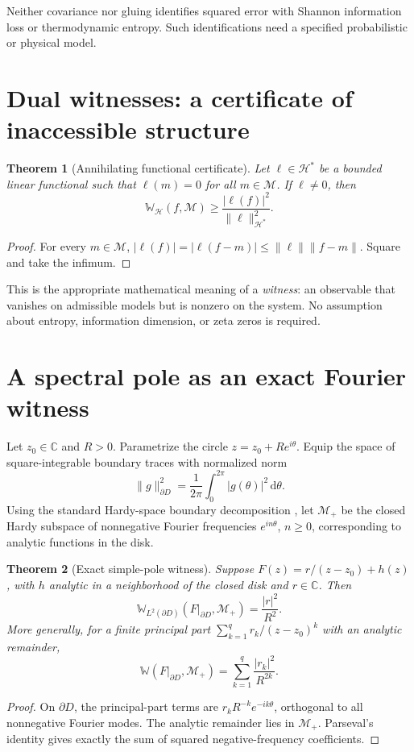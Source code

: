 \documentclass[11pt,letterpaper]{article}
\newtheorem{theorem}{Theorem}[section]
\newcommand{\HH}{\mathcal H}
\newcommand{\MM}{\mathcal M}
\newcommand{\WW}{\mathbb W}
\newcommand{\dd}{\,\mathrm d}
\newcommand{\C}{\mathbb C}
\begin{document}
Neither covariance nor gluing identifies squared error with Shannon
information loss or thermodynamic entropy. Such identifications need
a specified probabilistic or physical model.
\section{Dual witnesses: a certificate of inaccessible structure}
\begin{theorem}[Annihilating functional certificate]\label{thm:dual}
Let $\ell\in\HH^*$ be a bounded linear functional such that $\ell(m)=0$ for all $m\in\MM$. If $\ell\ne0$, then
\begin{equation}\label{eq:dual}
\WW_\HH(f,\MM)\ge\frac{|\ell(f)|^2}{\|\ell\|_{\HH^*}^2}.
\end{equation}
\end{theorem}
\begin{proof}
For every $m\in\MM$, $|\ell(f)|=|\ell(f-m)|\le\|\ell\|\|f-m\|$. Square and take the infimum.
\end{proof}

This is the appropriate mathematical meaning of a \emph{witness}: an observable that vanishes on admissible models but is nonzero on the system. No assumption about entropy, information dimension, or zeta zeros is required.

\section{A spectral pole as an exact Fourier witness}
Let $z_0\in\C$ and $R>0$. Parametrize the circle $z=z_0+Re^{i\theta}$. Equip the space of square-integrable boundary traces with normalized norm
\[
\|g\|_{\partial D}^2=\frac1{2\pi}\int_0^{2\pi}|g(\theta)|^2\dd\theta.
\]
Using the standard Hardy-space boundary decomposition \cite{duren}, let $\MM_+$ be the closed Hardy subspace of nonnegative Fourier frequencies $e^{in\theta}$, $n\ge0$, corresponding to analytic functions in the disk.

\begin{theorem}[Exact simple-pole witness]\label{thm:pole}
Suppose $F(z)=r/(z-z_0)+h(z)$, with $h$ analytic in a neighborhood of the closed disk and $r\in\C$. Then
\begin{equation}\label{eq:pole}
\WW_{L^2(\partial D)}(F|_{\partial D},\MM_+)=\frac{|r|^2}{R^2}.
\end{equation}
More generally, for a finite principal part $\sum_{k=1}^q r_k/(z-z_0)^k$ with an analytic remainder,
\[
\WW(F|_{\partial D},\MM_+)=\sum_{k=1}^q\frac{|r_k|^2}{R^{2k}}.
\]
\end{theorem}
\begin{proof}
On $\partial D$, the principal-part terms are $r_kR^{-k}e^{-ik\theta}$, orthogonal to all nonnegative Fourier modes. The analytic remainder lies in $\MM_+$. Parseval's identity gives exactly the sum of squared negative-frequency coefficients.
\end{proof}
\end{document}
